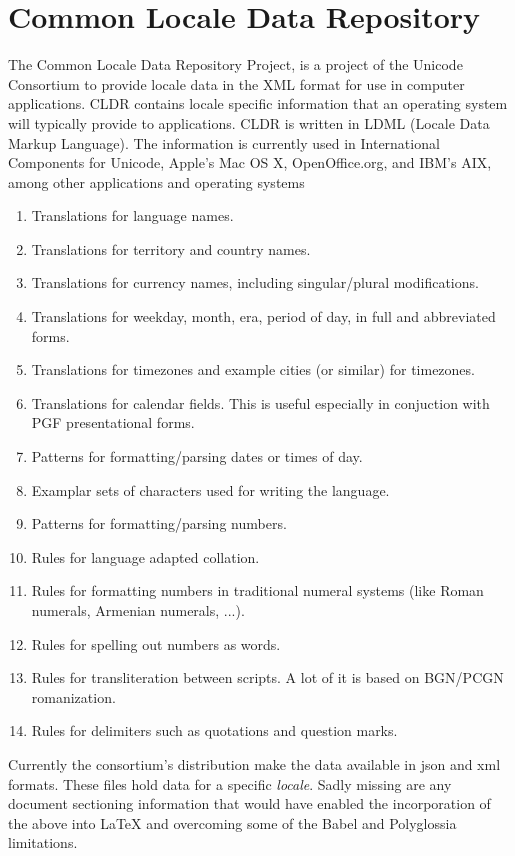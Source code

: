 \section{Common Locale Data Repository}

The Common Locale Data Repository Project, is a project of the Unicode Consortium to provide locale data in the XML format for use in computer applications. CLDR contains locale specific information that an operating system will typically provide to applications. CLDR is written in LDML (Locale Data Markup Language). The information is currently used in International Components for Unicode, Apple's Mac OS X, OpenOffice.org, and IBM's AIX, among other applications and operating systems

\begin{enumerate}
\item Translations for language names.
\item Translations for territory and country names.
\item Translations for currency names, including singular/plural modifications.
\item Translations for weekday, month, era, period of day, in full and abbreviated forms.
\item Translations for timezones and example cities (or similar) for timezones.
\item Translations for calendar fields. This is useful especially in conjuction with PGF presentational forms.
\item Patterns for formatting/parsing dates or times of day.
\item Examplar sets of characters used for writing the language.
\item Patterns for formatting/parsing numbers.
\item Rules for language adapted collation. \label{collation}
\item Rules for formatting numbers in traditional numeral systems (like Roman numerals, Armenian numerals, ...).
\item Rules for spelling out numbers as words.
\item Rules for transliteration between scripts. A lot of it is based on BGN/PCGN romanization.
\item Rules for delimiters such as quotations and question marks.
\end{enumerate}

Currently the consortium’s distribution make the data available in json and xml formats.  These files hold data for a specific \emph{locale}. Sadly missing are any document sectioning information that would have enabled the incorporation of the above into LaTeX and overcoming some of the Babel and Polyglossia limitations.


